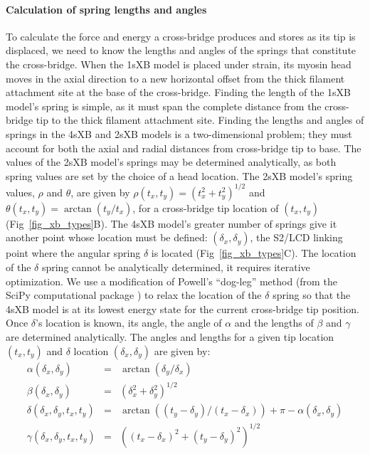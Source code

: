 \documentclass[10pt]{article}
\newcommand{\citep}[1]{\cite{#1}} %
\begin{document}
\paragraph{Calculation of spring lengths and angles} %
To calculate the force and energy a cross-bridge produces and stores as its tip is displaced, we need to know the lengths and angles of the springs that constitute the cross-bridge. 
When the 1sXB model is placed under strain, its myosin head moves in the axial direction to a new horizontal offset from the thick filament attachment site at the base of the cross-bridge.
Finding the length of the 1sXB model's spring is simple, as it must span the complete distance from the cross-bridge tip to the thick filament attachment site. 
Finding the lengths and angles of springs in the 4sXB and 2sXB models is a two-dimensional problem; they must account for both the axial and radial distances from cross-bridge tip to base.
The values of the 2sXB model's springs may be determined analytically, as both spring values are set by the choice of a head location. 
The 2sXB model's spring values, $\rho$ and $\theta$, are given by $\rho(t_x, t_y)=(t_x^2 + t_y^2)^{1/2}$ and $\theta(t_x, t_y)=\arctan(t_y/t_x)$, for a cross-bridge tip location of $(t_x, t_y)$ (Fig~\ref{fig_xb_types}B). 
The 4sXB model's greater number of springs give it another point whose location must be defined: $(\delta_x, \delta_y)$, the S2/LCD linking point where the angular spring $\delta$ is located (Fig~\ref{fig_xb_types}C). 
The location of the $\delta$ spring cannot be analytically determined, it requires iterative optimization. 
We use a modification of Powell's ``dog-leg'' method (from the SciPy computational package \citep{SciPy}) to relax the location of the $\delta$ spring so that the 4sXB model is at its lowest energy state for the current cross-bridge tip position.
Once $\delta$'s location is known, its angle, the angle of $\alpha$ and the lengths of $\beta$ and $\gamma$ are determined analytically.
The angles and lengths for a given tip location $(t_x, t_y)$ and $\delta$ location $(\delta_x, \delta_y)$ are given by:
\begin{eqnarray*}
\label{4sXB_spring_values}
\alpha(\delta_x, \delta_y) &=& \arctan(\delta_y/\delta_x) \\
\beta(\delta_x, \delta_y) &=& (\delta_x^2 + \delta_y^2)^{1/2} \\
\delta(\delta_x, \delta_y, t_x, t_y) &=& \arctan((t_y-\delta_y)/(t_x-\delta_x)) + \pi - \alpha(\delta_x, \delta_y) \\
\gamma(\delta_x, \delta_y, t_x, t_y) &=& ((t_x-\delta_x)^2 + (t_y-\delta_y)^2)^{1/2} 
\end{eqnarray*}
\end{document}

